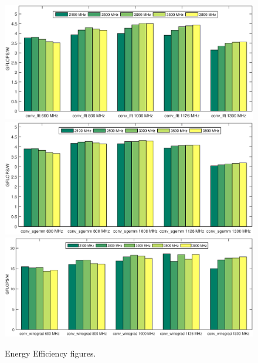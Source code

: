 \documentclass[conference]{IEEEtran}
\begin{document}
\begin{figure}[ht]
	\centering     %
	\subfigure%
	{
		\includegraphics[width=0.9\linewidth]{ee_fft.eps}
	}
	\subfigure%
	{
		\includegraphics[width=0.9\linewidth]{ee_sgemm.eps}
	}
	\subfigure%
	{
		\includegraphics[width=0.9\linewidth]{ee_winograd.eps}
	}
	\caption{\label{fig:ee} Energy Efficiency figures.}
\end{figure}



\end{document}
